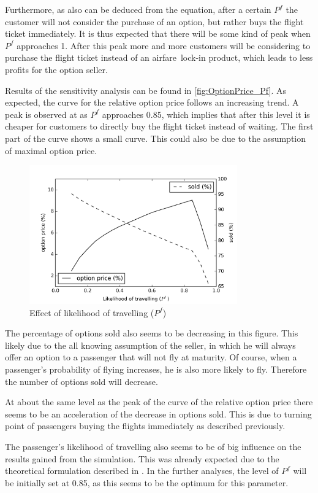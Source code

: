 Furthermore, as also can be deduced from the equation, after a certain $P^f$ the customer will not consider the purchase of an option, but rather buys the flight ticket immediately. It is thus expected that there will be some kind of peak when $P^f$ approaches 1. After this peak more and more customers will be considering to purchase the flight ticket instead of an airfare~lock-in product, which leads to less profits for the option seller.

Results of the sensitivity analysis can be found in  \autoref{fig:OptionPrice_Pf}. As expected, the curve for the relative option price follows an increasing trend. A peak is observed at as $P^f$ approaches 0.85, which implies that after this level it is cheaper for customers to directly buy the flight ticket instead of waiting. The first part of the curve shows a small curve. This could also be due to the assumption of maximal option price.

\begin{figure}
    \centering
    \includegraphics[width=0.8\textwidth]{figures/OptionPrice_Pf.png}
    \caption{Effect of likelihood of travelling ($P^f$)}
    \label{fig:OptionPrice_Pf}
\end{figure}


The percentage of options sold also seems to be decreasing in this figure. This likely due to the all knowing assumption of the seller, in which he will always offer an option to a passenger that will not fly at maturity. Of course, when a passenger's probability of flying increases, he is also more likely to fly. Therefore the number of options sold will decrease.

At about the same level as the peak of the curve of the relative option price there seems to be an acceleration of the decrease in options sold. This is due to turning point of passengers buying the flights immediately as described previously.

The passenger's likelihood of travelling also seems to be of big influence on the results gained from the simulation. This was already expected due to the theoretical formulation described in . In the further analyses, the level of $P^f$ will be initially set at 0.85, as this seems to be the optimum for this parameter. 


